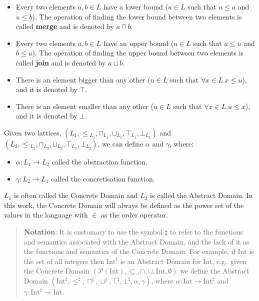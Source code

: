 \begin{itemize}
\tightlist
\item
  Every two elements \(a, b \in L\) have a lower bound (\(u \in L\) such
  that \(u \le a\) and \(u \le b\)). The operation of finding the lower
  bound between two elements is called \textbf{merge} and is denoted by
  \(a \sqcap b\).
\item
  Every two elements \(a, b \in L\) have an upper bound (\(u \in L\)
  such that \(a \le u\) and \(b \le u\)). The operation of finding the
  upper bound between two elements is called \textbf{join} and is
  denoted by \(a \sqcup b\).
\item
  There is an element bigger than any other (\(u \in L\) such that
  \(\forall x \in L . x \le u\)), and it is denoted by \(\top\).
\item
  There is an element smaller than any other (\(u \in L\) such that
  \(\forall x \in L . u \le x\)), and it is denoted by \(\bot\).
\end{itemize}

Given two lattices,
\((L_1, \le{}_{L_1}, \sqcap{}_{L_1}, \sqcup{}_{L_1}, \top{}_{L_1}, \bot{}_{L_1})\)
and
\((L{}_2, \le{}_{L_2}, \sqcap{}_{L_2}, \sqcup{}_{L_2}, \top{}_{L_2}, \bot{}_{L_2})\),
we can define \(\alpha\) and \(\gamma\), where:

\begin{itemize}
\tightlist
\item \(\alpha : L_1 \rightarrow L_2\) called the abstraction function.
\item \(\gamma : L_2 \rightarrow L_1\) called the concretisation function.
\end{itemize}

\(L_1\) is often called the Concrete Domain and \(L_2\) is called the Abstract Domain. In
this work, the Concrete Domain will always be defined as the power set of the values in
the language with \(\in\) as the order operator.

\begin{quote}
\textbf{Notation}: It is customary to use the symbol \(\sharp\) to refer to
the functions and semantics associated with the Abstract Domain, and the
lack of it as the functions and semantics of the Concrete Domain. For
example, if \(\text{Int}\) is the set of all integers then \(\text{Int}^{\sharp}\) is an
Abstract Domain for \(\text{Int}\), e.g.~given the Concrete Domain
\((\mathcal{P}(\text{Int}), \subseteq, \cap, \cup, \text{Int}, \emptyset)\) we define
the Abstract Domain
\((\text{Int}^{\sharp}, \le^{\sharp}, \sqcap^{\sharp}, \sqcup^{\sharp}, \top^{\sharp}, \bot^{\sharp}, \alpha, \gamma)\),
where \(\alpha : \text{Int} \rightarrow \text{Int}^{\sharp}\) and
\(\gamma : \text{Int}^{\sharp} \rightarrow \text{Int}\).
\end{quote}

